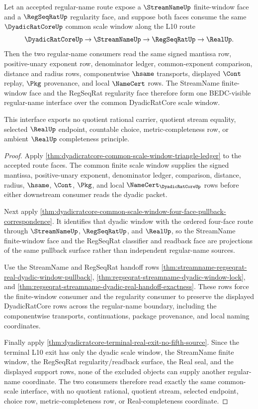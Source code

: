 \begin{theorem}
\label{thm:dyadicratcore-common-scale-regular-name-interface}
Let an accepted regular-name route expose a $\StreamNameUp$ finite-window face and a $\RegSeqRatUp$ regularity face, and suppose both faces consume the same $\DyadicRatCoreUp$ common scale window along the L10 route
$$
\DyadicRatCoreUp \to \StreamNameUp \to \RegSeqRatUp \to \RealUp .
$$
Then the two regular-name consumers read the same signed mantissa row, positive-unary exponent row, denominator ledger, common-exponent comparison, distance and radius rows, componentwise $\hsame$ transports, displayed $\Cont$ replay, $\Pkg$ provenance, and local $\NameCert$ rows. The StreamName finite-window face and the RegSeqRat regularity face therefore form one BEDC-visible regular-name interface over the common DyadicRatCore scale window.

This interface exports no quotient rational carrier, quotient stream equality, selected $\RealUp$ endpoint, countable choice, metric-completeness row, or ambient $\RealUp$ completeness principle.
\end{theorem}
\begin{proof}
Apply \autoref{thm:dyadicratcore-common-scale-window-triangle-ledger} to the accepted route faces. The common finite scale window supplies the signed mantissa, positive-unary exponent, denominator ledger, comparison, distance, radius, $\hsame$, $\Cont$, $\Pkg$, and local $\NameCert_{\DyadicRatCoreUp}$ rows before either downstream consumer reads the dyadic packet.

Next apply \autoref{thm:dyadicratcore-common-scale-window-four-face-pullback-correspondence}. It identifies that dyadic window with the ordered four-face route through $\StreamNameUp$, $\RegSeqRatUp$, and $\RealUp$, so the StreamName finite-window face and the RegSeqRat classifier and readback face are projections of the same pullback surface rather than independent regular-name sources.

Use the StreamName and RegSeqRat handoff rows \autoref{thm:streamname-regseqrat-real-dyadic-window-pullback}, \autoref{thm:regseqrat-streamname-dyadic-window-lock}, and \autoref{thm:regseqrat-streamname-dyadic-real-handoff-exactness}. These rows force the finite-window consumer and the regularity consumer to preserve the displayed DyadicRatCore rows across the regular-name boundary, including the componentwise transports, continuations, package provenance, and local naming coordinates.

Finally apply \autoref{thm:dyadicratcore-terminal-real-exit-no-fifth-source}. Since the terminal L10 exit has only the dyadic scale window, the StreamName finite window, the RegSeqRat regularity/readback surface, the Real seal, and the displayed support rows, none of the excluded objects can supply another regular-name coordinate. The two consumers therefore read exactly the same common-scale interface, with no quotient rational, quotient stream, selected endpoint, choice row, metric-completeness row, or Real-completeness coordinate.
\end{proof}

